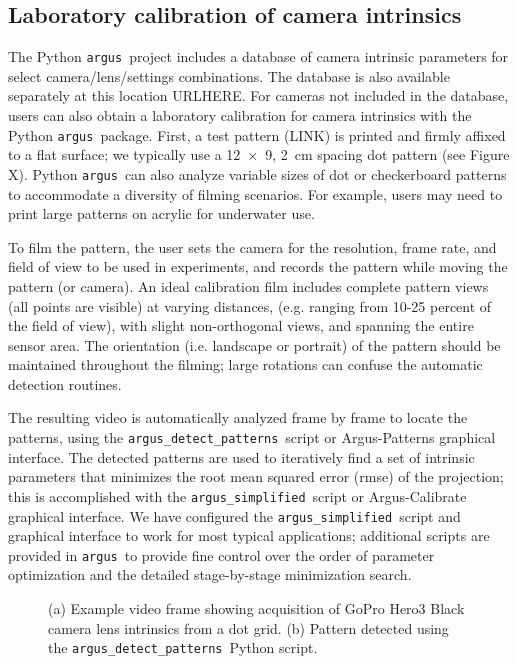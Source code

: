 \documentclass[fleqn,10pt]{wlpeerj}
\newcommand{\argus}{\texttt{argus}}
\newcommand{\detectpatterns}{\texttt{argus\_detect\_patterns}}
\newcommand{\simplified}{\texttt{argus\_simplified}}
\begin{document}
\subsection*{Laboratory calibration of camera intrinsics}
The Python \argus\ project includes a database of camera intrinsic parameters for select camera/lens/settings combinations.  The database is also available separately at this location URLHERE. For cameras not included in the database, users can also obtain a laboratory calibration for camera intrinsics with the  Python \argus\ package. First, a test pattern (LINK) is printed and firmly affixed to a flat surface; we typically use a \num{12 x 9}, \SI{2}{\centi\meter} spacing dot pattern (see Figure X). Python \argus\ can also analyze variable sizes of dot or checkerboard patterns to accommodate a diversity of filming scenarios.  For example, users may need to print large patterns on acrylic for underwater use.

To film the pattern, the user sets the camera for the resolution, frame rate, and field of view to be used in experiments, and records the pattern while moving the pattern (or camera). An ideal calibration film includes complete pattern views (all points are visible) at varying distances, (e.g. ranging from 10-25 percent of the field of view), with slight non-orthogonal views, and spanning the entire sensor area. The orientation (i.e. landscape or portrait) of the pattern should be maintained throughout the filming; large rotations can confuse the automatic detection routines. 

The resulting video is automatically analyzed frame by frame to locate the patterns, using the \detectpatterns\ script or Argus-Patterns graphical interface.  The detected patterns are used to iteratively find a set of intrinsic parameters that minimizes the root mean squared error (rmse) of the projection; this is accomplished with the \simplified\ script or Argus-Calibrate graphical interface.  We have configured the \simplified\ script and graphical interface to work for most typical applications; additional scripts are provided in \argus\ to provide fine control over the order of parameter optimization and the detailed stage-by-stage minimization search.

\begin{figure}
\caption{(a) Example video frame showing acquisition of GoPro Hero3 Black camera lens intrinsics from a dot grid.  (b) Pattern detected using the \detectpatterns\ Python script.}
\label{fig:labcal1}
\end{figure}
\end{document}
